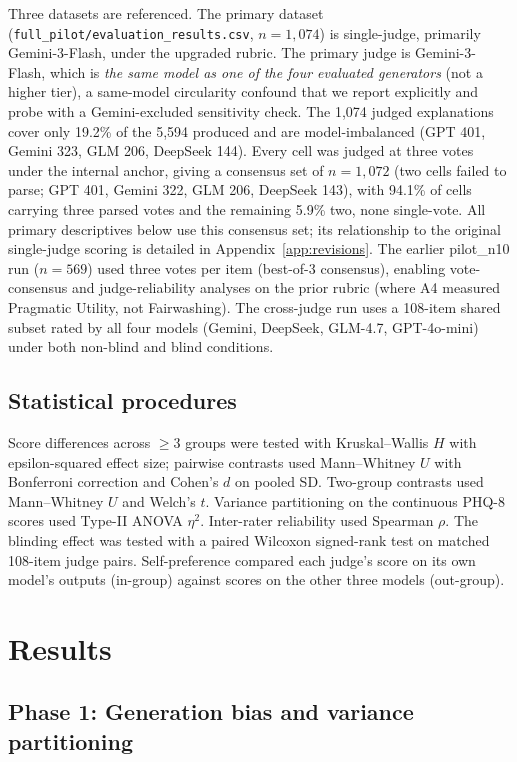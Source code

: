 \documentclass[11pt]{article}
\begin{document}
Three datasets are referenced. The primary dataset (\texttt{full\_pilot/evaluation\_results.csv}, $n=1{,}074$) is single-judge, primarily Gemini-3-Flash, under the upgraded rubric. The primary judge is Gemini-3-Flash, which is \emph{the same model as one of the four evaluated generators} (not a higher tier), a same-model circularity confound that we report explicitly and probe with a Gemini-excluded sensitivity check. The 1,074 judged explanations cover only 19.2\% of the 5,594 produced and are model-imbalanced (GPT 401, Gemini 323, GLM 206, DeepSeek 144). Every cell was judged at three votes under the internal anchor, giving a consensus set of $n=1{,}072$ (two cells failed to parse; GPT 401, Gemini 322, GLM 206, DeepSeek 143), with 94.1\% of cells carrying three parsed votes and the remaining 5.9\% two, none single-vote. All primary descriptives below use this consensus set; its relationship to the original single-judge scoring is detailed in Appendix~\ref{app:revisions}. The earlier pilot\_n10 run ($n=569$) used three votes per item (best-of-3 consensus), enabling vote-consensus and judge-reliability analyses on the prior rubric (where A4 measured Pragmatic Utility, not Fairwashing). The cross-judge run uses a 108-item shared subset rated by all four models (Gemini, DeepSeek, GLM-4.7, GPT-4o-mini) under both non-blind and blind conditions.

\subsection{Statistical procedures}

Score differences across $\geq 3$ groups were tested with Kruskal--Wallis $H$ with epsilon-squared effect size; pairwise contrasts used Mann--Whitney $U$ with Bonferroni correction and Cohen's $d$ on pooled SD. Two-group contrasts used Mann--Whitney $U$ and Welch's $t$. Variance partitioning on the continuous PHQ-8 scores used Type-II ANOVA $\eta^2$. Inter-rater reliability used Spearman $\rho$. The blinding effect was tested with a paired Wilcoxon signed-rank test on matched 108-item judge pairs. Self-preference compared each judge's score on its own model's outputs (in-group) against scores on the other three models (out-group).

\section{Results}

\subsection{Phase 1: Generation bias and variance partitioning}
\end{document}
